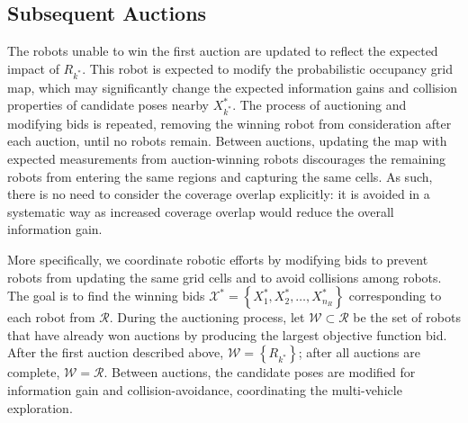 \documentclass[smallextended]{svjour3}       %
\newcommand{\braces}[1]{\ensuremath{\left\{ #1 \right\}}}
\newcommand{\refeqn}[1]{(\ref{eqn:#1})}
\begin{document}
\subsection{Subsequent Auctions}

The robots unable to win the first auction are updated to reflect the expected impact of $R_{k^*}$. This robot is expected to modify the probabilistic occupancy grid map, which may significantly change the expected information gains and collision properties of candidate poses nearby $X^*_{k^*}$. The process of auctioning and modifying bids is repeated, removing the winning robot from consideration after each auction, until no robots remain. Between auctions, updating the map with expected measurements from auction-winning robots discourages the remaining robots from entering the same regions and capturing the same cells. As such, there is no need to consider the coverage overlap explicitly: it is avoided in a systematic way as increased coverage overlap would reduce the overall information gain.



More specifically, we coordinate robotic efforts by modifying bids to prevent robots from updating the same grid cells and to avoid collisions among robots. The goal is to find the winning bids $\mathcal X^*=\braces{X^*_{1},X^*_{2},\dots,X^*_{n_R}}$ corresponding to each robot from $\mathcal R$. During the auctioning process, let $\mathcal W\subset\mathcal R$ be the set of robots that have already won auctions by producing the largest objective function bid. After the first auction described above, $\mathcal W=\braces{R_{k^*}}$; after all auctions are complete, $\mathcal W=\mathcal R$. Between auctions, the candidate poses are modified for information gain and collision-avoidance, coordinating the multi-vehicle exploration.

\end{document}
